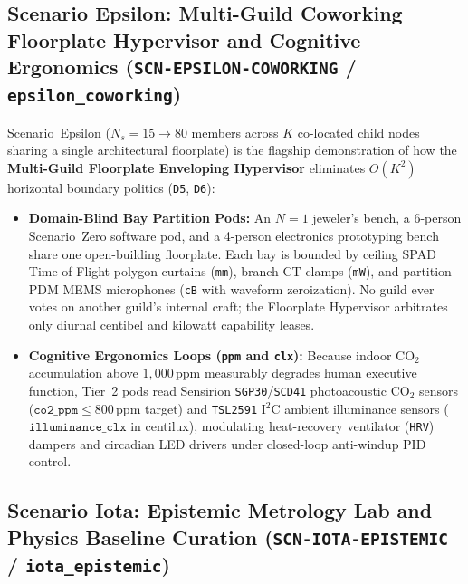 \subsection{Scenario Epsilon: Multi-Guild Coworking Floorplate Hypervisor and Cognitive Ergonomics (\texttt{SCN-EPSILON-COWORKING} / \texttt{epsilon\_coworking})}

Scenario~Epsilon ($N_s = 15 \to 80$ members across $K$ co-located child nodes sharing a single architectural floorplate) is the flagship demonstration of how the \textbf{Multi-Guild Floorplate Enveloping Hypervisor} eliminates $O(K^2)$ horizontal boundary politics (\texttt{D5}, \texttt{D6}):
\begin{itemize}
    \item \textbf{Domain-Blind Bay Partition Pods:} An $N=1$ jeweler's bench, a 6-person Scenario~Zero software pod, and a 4-person electronics prototyping bench share one open-building floorplate. Each bay is bounded by ceiling SPAD Time-of-Flight polygon curtains (\texttt{mm}), branch CT clamps (\texttt{mW}), and partition PDM MEMS microphones (\texttt{cB} with waveform zeroization). No guild ever votes on another guild's internal craft; the Floorplate Hypervisor arbitrates only diurnal centibel and kilowatt capability leases.
    \item \textbf{Cognitive Ergonomics Loops (\texttt{ppm} and \texttt{clx}):} Because indoor $\mathrm{CO_2}$ accumulation above $1{,}000\,\mathrm{ppm}$ measurably degrades human executive function, Tier~2 pods read Sensirion \texttt{SGP30}/\texttt{SCD41} photoacoustic $\mathrm{CO_2}$ sensors ($\mathtt{co2\_ppm} \le 800\,\mathrm{ppm}$ target) and \texttt{TSL2591} I$^2$C ambient illuminance sensors ($\mathtt{illuminance\_clx}$ in centilux), modulating heat-recovery ventilator (\texttt{HRV}) dampers and circadian LED drivers under closed-loop anti-windup PID control.
\end{itemize}

\subsection{Scenario Iota: Epistemic Metrology Lab and Physics Baseline Curation (\texttt{SCN-IOTA-EPISTEMIC} / \texttt{iota\_epistemic})}

